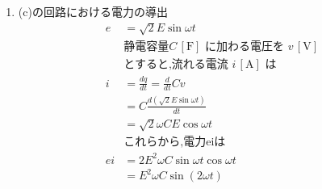 \documentclass[twocolumn]{article}
\begin{document}
\begin{enumerate}
  \item (c)の回路における電力の導出
    \begin{align*}
    e &=\sqrt{2}E\sin\omega t\\
    &\text{静電容量} C\,[\text{F}] \text{ に加わる電圧を } v\,[\text{V}] \\
    &\text{とすると,流れる電流 } i\,[\text{A}] \text{ は} \\
    i   &= \frac{dq}{dt} = \frac{d}{dt}Cv \\
        &= C \frac{d \left(\sqrt{2}E\sin \omega t\right)}{dt} \\
        &= \sqrt{2}\omega CE\cos\omega t\\
    &\text{これらから,電力eiは}\\
    ei &= 2E^2 \omega C \sin\omega t \cos \omega t \\ 
    &= E^2 \omega C \sin \left(2 \omega t\right)\\
    \end{align*}


\end{enumerate}
\end{document}
